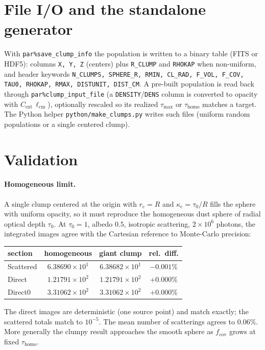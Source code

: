 \documentclass[english,a4paper]{kiseon_memo}
\newcommand{\kc}{\kappa_{\mathrm c}}
\newcommand{\rc}{r_{\mathrm c}}
\newcommand{\fcov}{f_{\mathrm{cov}}}
\begin{document}
\section{File I/O and the standalone generator}
With \texttt{par\%save\_clump\_info} the population is written to a binary
table (FITS or HDF5): columns \texttt{X, Y, Z} (centers) plus \texttt{R\_CLUMP}
and \texttt{RHOKAP} when non-uniform, and header keywords
\texttt{N\_CLUMPS, SPHERE\_R, RMIN, CL\_RAD, F\_VOL, F\_COV, TAU0, RHOKAP,
RMAX, DISTUNIT, DIST\_CM}.  A pre-built population is read back through
\texttt{par\%clump\_input\_file} (a \texttt{DENSITY}/\texttt{DENS} column is
converted to opacity with $C_{\mathrm{ext}}\,\ell_{\mathrm{cm}}$), optionally
rescaled so its realized $\tau_{\max}$ or $\tau_{\mathrm{homo}}$ matches a
target.  The Python helper \texttt{python/make\_clumps.py} writes such files
(uniform random populations or a single centered clump).

\section{Validation}
\paragraph{Homogeneous limit.}
A single clump centered at the origin with $\rc=R$ and $\kc=\tau_{0}/R$ fills
the sphere with uniform opacity, so it must reproduce the homogeneous dust
sphere of radial optical depth $\tau_{0}$.  At $\tau_{0}=1$, albedo $0.5$,
isotropic scattering, $2\times10^{6}$ photons, the integrated images agree with
the Cartesian reference to Monte-Carlo precision:
\begin{center}
\begin{tabular}{lccc}
\hline
section    & homogeneous & giant clump & rel.\ diff.\\
\hline
Scattered  & $6.38690\times10^{1}$ & $6.38682\times10^{1}$ & $-0.001\%$\\
Direct     & $1.21791\times10^{2}$ & $1.21791\times10^{2}$ & $+0.000\%$\\
Direct0    & $3.31062\times10^{2}$ & $3.31062\times10^{2}$ & $+0.000\%$\\
\hline
\end{tabular}
\end{center}
The direct images are deterministic (one source point) and match exactly; the
scattered totals match to $10^{-5}$.  The mean number of scatterings agrees to
$0.06\%$.  More generally the clumpy result approaches the smooth sphere as
$\fcov$ grows at fixed $\tau_{\mathrm{homo}}$.
\end{document}
